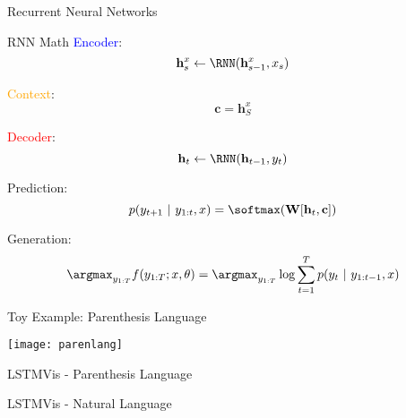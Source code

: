 \begin{frame}{Recurrent Neural Networks}
  \vspace{-0.25cm}

  \begin{center}
  \end{center}
\end{frame}


\begin{frame}{RNN Math}
  \textcolor{blue}{Encoder}:
  \[{\mathbf{h}^{x}_s \gets \RNN(\mathbf{h}^{x}_{s-1}, x_s)} \]

  \textcolor{orange}{Context}:
  \[ {\mathbf{c}} = \mathbf{h}^{x}_S \]

  \textcolor{red}{Decoder}:
  \[{\mathbf{h}_t \gets \RNN(\mathbf{h}_{t-1}, y_t)} \]

  Prediction:
  \[ p(y_{t+1}\  |\  y_{1:t}, x) = \softmax( \mathbf{W} [\mathbf{h}_t, \mathbf{c}]) \]

  \pause 

  Generation:
  \[ \argmax_{y_{1:T}} f(y_{1:T}; x, \theta) = \argmax_{y_{1:T}} \log \sum_{t=1}^T p(y_{t}\  |\  y_{1:t-1}, x) \] 

\end{frame}

\begin{frame}{Toy Example: Parenthesis Language}
  \begin{center}
    \texttt{[image: parenlang]}
  \end{center}
\end{frame}

\begin{frame}{LSTMVis - Parenthesis Language}
  \vspace{-0.25cm}

  \begin{center}
  \end{center}
\end{frame}


\begin{frame}{LSTMVis - Natural Language}
  \vspace{-0.25cm}


  \begin{center}
  \end{center}
\end{frame}


